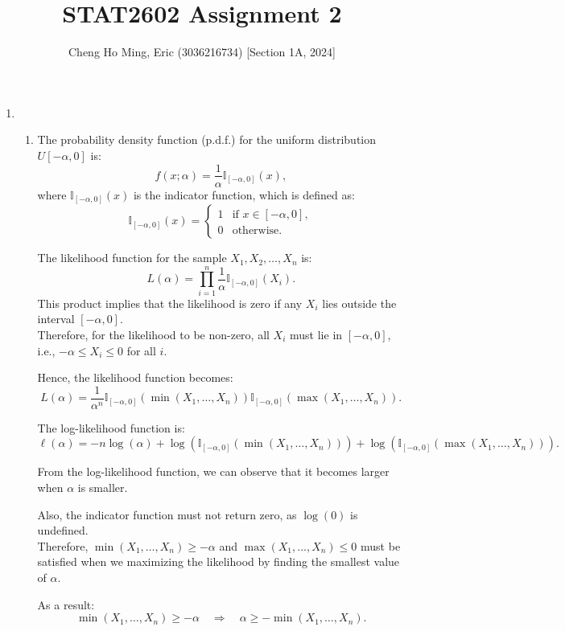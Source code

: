 \documentclass{article}
\title{STAT2602 Assignment 2}
\author{Cheng Ho Ming, Eric (3036216734) [Section 1A, 2024]}
\begin{document}
\maketitle

\begin{enumerate}
\item
    \begin{enumerate}[label=(\roman*)]
    \item The probability density function (p.d.f.) for the uniform distribution $U[-\alpha, 0]$ is:
    \[
    f(x; \alpha) = \frac{1}{\alpha} \mathbb{I}_{[-\alpha, 0]}(x),
    \]
    where $\mathbb{I}_{[-\alpha, 0]}(x)$ is the indicator function, which is defined as:
    \[
    \mathbb{I}_{[-\alpha, 0]}(x) =
    \begin{cases}
    1 & \text{if } x \in [-\alpha, 0], \\
    0 & \text{otherwise}.
    \end{cases}
    \]

    The likelihood function for the sample $X_1, X_2, \dots, X_n$ is:
    \[
    L(\alpha) = \prod_{i=1}^{n} \frac{1}{\alpha} \mathbb{I}_{[-\alpha, 0]}(X_i).
    \]
    This product implies that the likelihood is zero if any $X_i$ lies outside the interval $[-\alpha, 0]$. \\
    Therefore, for the likelihood to be non-zero, all $X_i$ must lie in $[-\alpha, 0]$, i.e., $-\alpha \leq X_i \leq 0$ for all $i$.

    Hence, the likelihood function becomes:
    \[
    L(\alpha) = \frac{1}{\alpha^n} \mathbb{I}_{[-\alpha, 0]}(\min(X_1, \dots, X_n)) \mathbb{I}_{[-\alpha, 0]}(\max(X_1, \dots, X_n)).
    \]

    The log-likelihood function is:
    \[
    \ell(\alpha) = -n \log(\alpha) + \log \left( \mathbb{I}_{[-\alpha, 0]}(\min(X_1, \dots, X_n)) \right) + \log \left( \mathbb{I}_{[-\alpha, 0]}(\max(X_1, \dots, X_n)) \right).
    \]

    From the log-likelihood function, we can observe that it becomes larger when $\alpha$ is smaller.

    Also, the indicator function must not return zero, as $\log(0)$ is undefined. \\
    Therefore, $\min(X_1, \dots, X_n) \geq -\alpha$ and $\max(X_1, \dots, X_n) \leq 0$ must be satisfied when we maximizing the likelihood by finding the smallest value of $\alpha$.

    As a result:
    \[
    \min(X_1, \dots, X_n) \geq -\alpha
    \quad \Rightarrow \quad
    \alpha \geq - \min(X_1, \dots, X_n).
    \]


\end{enumerate}
\end{enumerate}
\end{document}

